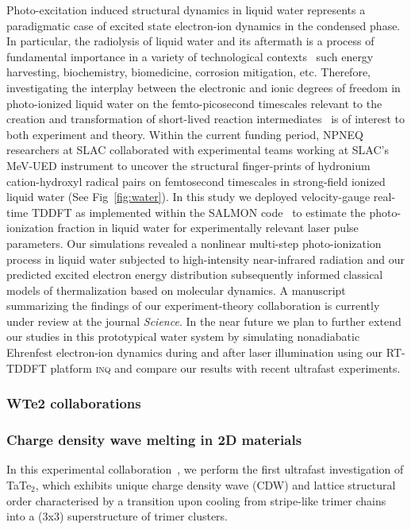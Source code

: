 Photo-excitation induced structural dynamics in liquid water represents a paradigmatic case of excited state electron-ion dynamics in the condensed phase. 
In particular, the radiolysis of liquid water and its aftermath is a process of fundamental importance in a variety of technological contexts~\cite{Garrett2005} such energy harvesting, biochemistry, biomedicine, corrosion mitigation, etc. 
Therefore, investigating the interplay between the electronic and ionic degrees of freedom in photo-ionized liquid water on the femto-picosecond timescales relevant to the creation and transformation of short-lived reaction intermediates~\cite{Loh2020} is of interest to both experiment and theory.
Within the current funding period, NPNEQ researchers at SLAC collaborated with experimental teams working at SLAC's MeV-UED instrument to uncover the structural finger-prints of hydronium cation-hydroxyl radical pairs on femtosecond timescales in strong-field ionized liquid water (See Fig~\ref{fig:water}). 
In this study we deployed velocity-gauge real-time TDDFT as implemented within the \textsc{SALMON} code~\cite{salmon} to estimate the photo-ionization fraction in liquid water for experimentally relevant laser pulse parameters. 
Our simulations revealed a nonlinear multi-step photo-ionization process in liquid water subjected to high-intensity near-infrared radiation and our predicted excited electron energy distribution subsequently informed classical models of thermalization based on molecular dynamics. A manuscript summarizing the findings of our experiment-theory collaboration is currently under review at the journal \textit{Science}.
In the near future we plan to further extend our studies in this prototypical water system by simulating nonadiabatic Ehrenfest electron-ion dynamics during and after laser illumination using our RT-TDDFT platform \textsc{inq} and compare our results with recent ultrafast experiments. 
\subsubsection{WTe2 collaborations}

\subsubsection{Charge density wave melting in 2D materials}
In this experimental collaboration~\cite{Siddiqui2020}, we perform the first ultrafast investigation of TaTe$_2$, which exhibits unique charge density wave (CDW) and lattice structural order characterised by a transition upon cooling from stripe-like trimer chains into a (3x3) superstructure of trimer clusters. 

